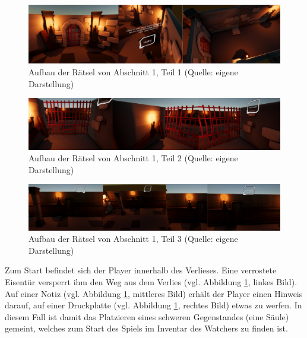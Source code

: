 \begin{figure}[ht]
\centering
\includegraphics[width=1\linewidth]{content/pictures/Rätseldesign - Abschnitt00 - Rätsel00.png}
\caption{Aufbau der Rätsel von Abschnitt 1, Teil 1 (Quelle: eigene Darstellung)}
\label{fig:riddle-design-section00-00}
\end{figure}

\begin{figure}[ht]
\centering
\includegraphics[width=1\linewidth]{content/pictures/Rätseldesign - Abschnitt00 - Rätsel01.png}
\caption{Aufbau der Rätsel von Abschnitt 1, Teil 2 (Quelle: eigene Darstellung)}
\label{fig:riddle-design-section00-01}
\end{figure}

\begin{figure}[ht]
\centering
\includegraphics[width=1\linewidth]{content/pictures/Rätseldesign - Abschnitt00 - Rätsel02.png}
\caption{Aufbau der Rätsel von Abschnitt 1, Teil 3 (Quelle: eigene Darstellung)}
\label{fig:riddle-design-section00-02}
\end{figure}

Zum Start befindet sich der Player innerhalb des Verlieses. Eine verrostete Eisentür versperrt ihm den Weg aus dem Verlies (vgl. Abbildung \ref{fig:riddle-design-section00-00}, linkes Bild). Auf einer Notiz (vgl. Abbildung \ref{fig:riddle-design-section00-00}, mittleres Bild) erhält der Player einen Hinweis darauf, auf einer Druckplatte (vgl. Abbildung \ref{fig:riddle-design-section00-00}, rechtes Bild) etwas zu werfen. In diesem Fall ist damit das Platzieren eines schweren Gegenstandes (eine Säule) gemeint, welches zum Start des Spiels im Inventar des Watchers zu finden ist. 

